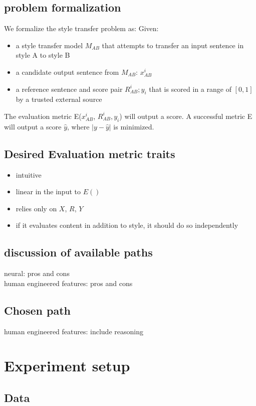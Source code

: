 \documentclass[letterpaper, 10 pt, conference]{ieeeconf}  %
\begin{document}
  \subsection{problem formalization} We formalize the style transfer problem as:
    Given:
    \begin{itemize}
      \item a style transfer model $M_{AB}$ that attempts to transfer an input sentence in style A to style B
      \item a candidate output sentence from $M_{AB}$:  $x_{AB}^i$
      \item a reference sentence and score pair $R_{AB}^i ; y_i$ that is scored in a range of $[0,1]$ by a trusted external source
    \end{itemize}

  The evaluation metric E($x_{AB}^i$, $R_{AB}^i, y_i$) will output a score. A successful metric E will output a score $\hat{y}$, where $|y-\hat{y}|$ is minimized.
  \subsection{Desired Evaluation metric traits}
    \begin{itemize}
      [TO EXPAND ON]
      \item intuitive
      \item linear in the input to $E()$
      \item relies only on $X$, $R$, $Y$
      \item if it evaluates content in addition to style, it should do so independently
    \end{itemize}
  \subsection{discussion of available paths} 
  neural: pros and cons\\
  human engineered features: pros and cons\\
  \subsection{Chosen path}
  human engineered features: include reasoning
  
\section{Experiment setup}
\subsection{Data}
\end{document}
